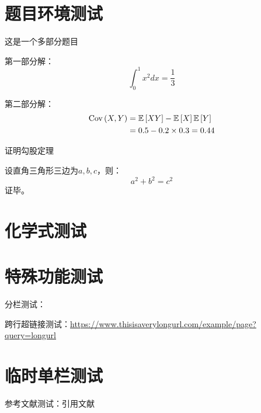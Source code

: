 \section{题目环境测试}
\begin{prob}[难度系数]
这是一个多部分题目
\end{prob}
\begin{subsol}
\item 第一部分解：
\[ \int_0^1 x^2 dx = \frac{1}{3} \]
\item 第二部分解：
\begin{align*}
\Cov{X}{Y} &= \Ex{XY} - \Ex{X}\Ex{Y} \\
&= 0.5 - 0.2 \times 0.3 = 0.44
\end{align*}
\end{subsol}

\begin{prob}
证明勾股定理
\end{prob}
\begin{pf}
设直角三角形三边为$a,b,c$，则：
\[ a^2 + b^2 = c^2 \]
证毕。
\end{pf}

\section{化学式测试}







\section{特殊功能测试}
分栏测试：

跨行超链接测试：\url{https://www.thisisaverylongurl.com/example/page?query=longurl}

\enteronecolumn
\section{临时单栏测试}
\exitonecolumn

参考文献测试：引用文献\parencite{chen2016xgboost}
